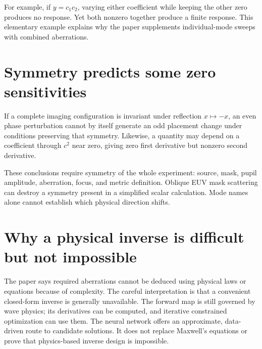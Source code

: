 For example, if $y=c_1c_2$, varying either coefficient while keeping the
other zero produces no response. Yet both nonzero together produce a
finite response. This elementary example explains why the paper
supplements individual-mode sweeps with combined aberrations.

\section{Symmetry predicts some zero sensitivities}
If a complete imaging configuration is invariant under reflection
$x\mapsto-x$, an even phase perturbation cannot by itself generate an
odd placement change under conditions preserving that symmetry.
Likewise, a quantity may depend on a coefficient through $c^2$ near zero,
giving zero first derivative but nonzero second derivative.

These conclusions require symmetry of the whole experiment: source,
mask, pupil amplitude, aberration, focus, and metric definition.
Oblique EUV mask scattering can destroy a symmetry present in a
simplified scalar calculation. Mode names alone cannot establish
which physical direction shifts.

\section{Why a physical inverse is difficult but not impossible}
The paper says required aberrations cannot be deduced using physical
laws or equations because of complexity. The careful interpretation is
that a convenient closed-form inverse is generally unavailable.
The forward map is still governed by wave physics; its derivatives can
be computed, and iterative constrained optimization can use them.
The neural network offers an approximate, data-driven route to candidate
solutions. It does not replace Maxwell's equations or prove that
physics-based inverse design is impossible.

